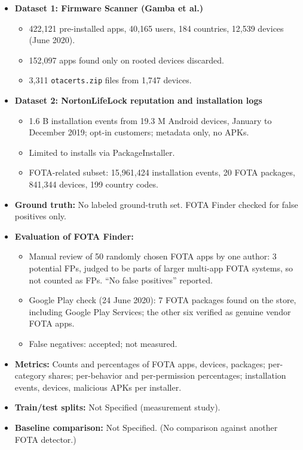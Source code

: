 \documentclass[11pt,a4paper]{article}
\begin{document}
\begin{enumerate}
    \begin{itemize}[leftmargin=*,itemsep=1pt,topsep=2pt]
        \item \textbf{Dataset 1: Firmware Scanner (Gamba et al.)}
        \begin{itemize}[itemsep=0pt]
            \item 422,121 pre-installed apps, 40,165 users, 184 countries, 12,539 devices (June 2020).
            \item 152,097 apps found only on rooted devices discarded.
            \item 3,311 \texttt{otacerts.zip} files from 1,747 devices.
        \end{itemize}
        \item \textbf{Dataset 2: NortonLifeLock reputation and installation logs}
        \begin{itemize}[itemsep=0pt]
            \item 1.6 B installation events from 19.3 M Android devices, January to December 2019; opt-in customers; metadata only, no APKs.
            \item Limited to installs via PackageInstaller.
            \item FOTA-related subset: 15,961,424 installation events, 20 FOTA packages, 841,344 devices, 199 country codes.
        \end{itemize}
        \item \textbf{Ground truth:} No labeled ground-truth set. FOTA Finder checked for false positives only.
        \item \textbf{Evaluation of FOTA Finder:}
        \begin{itemize}[itemsep=0pt]
            \item Manual review of 50 randomly chosen FOTA apps by one author: 3 potential FPs, judged to be parts of larger multi-app FOTA systems, so not counted as FPs. ``No false positives'' reported.
            \item Google Play check (24 June 2020): 7 FOTA packages found on the store, including Google Play Services; the other six verified as genuine vendor FOTA apps.
            \item False negatives: accepted; not measured.
        \end{itemize}
        \item \textbf{Metrics:} Counts and percentages of FOTA apps, devices, packages; per-category shares; per-behavior and per-permission percentages; installation events, devices, malicious APKs per installer.
        \item \textbf{Train/test splits:} Not Specified (measurement study).
        \item \textbf{Baseline comparison:} Not Specified. (No comparison against another FOTA detector.)
    \end{itemize}


\end{enumerate}
\end{document}
